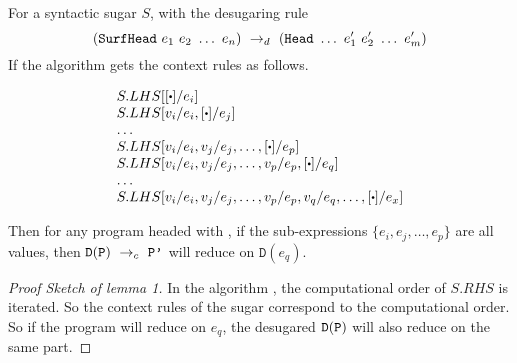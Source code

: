 \begin{lemma}
	For a syntactic sugar $S$, with the desugaring rule
	\[
	(\mbox{\tt SurfHead}~e_1~e_2~\ldots~e_n) ~\rightarrow_d~ (\mbox{\tt Head}~\ldots~e_1'~e_2'~\ldots~e_m')
	\]
	If the algorithm  gets the context rules as follows.\\

\begin{center}
	\[
		\begin{array}{l}
			S.LHS[[\bigcdot]/e_i]\\
			S.LHS[v_i/e_i, [\bigcdot]/e_j]\\
			\ldots\\
			S.LHS[v_i/e_i, v_j/e_j, \ldots, [\bigcdot]/e_p]\\
			S.LHS[v_i/e_i, v_j/e_j, \ldots, v_p/e_p, [\bigcdot]/e_q]\\
			\ldots\\
			S.LHS[v_i/e_i, v_j/e_j, \ldots, v_p/e_p, v_q/e_q, \ldots, [\bigcdot]/e_x]\\
		\end{array}
	\]


\end{center}

Then for any program  headed with , if the sub-expressions $\{e_i, e_j, \ldots, e_p\}$ are all values, then $\mathtt{D}(\mbox{\tt P}) ~\rightarrow_c~\mbox{\tt P'}$ will reduce on $\mathtt{D}(e_q)$.
\end{lemma}
\begin{proof}[Proof Sketch of lemma 1]
In the algorithm , the computational order of $S.RHS$ is iterated. So the context rules of the sugar correspond to the computational order.
So if the program  will reduce on $e_q$, the desugared $\mathtt{D}(\mbox{\tt P})$ will also reduce on the same part.
\end{proof}


